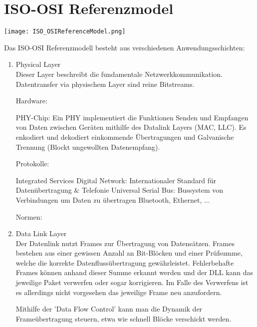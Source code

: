 \documentclass[11pt]{article}
\begin{document}
\section{ISO-OSI Referenzmodel}
    \texttt{[image: ISO\_OSIReferenceModel.png]}

    Das ISO-OSI Referenzmodell besteht aus verschiedenen Anwendungsschichten:
    \begin{enumerate}
        \item Physical Layer\\
        Dieser Layer beschreibt die fundamentale Netzwerkkommunikation. Datentransfer via
        physischem Layer sind reine Bitstreams.

        Hardware:
        \begin{addmargin}[1em]{1em}
            PHY-Chip: Ein PHY implementiert die Funktionen Senden und Empfangen von Daten zwischen
            Geräten mithilfe des Datalink Layers (MAC, LLC). Es enkodiert und dekodiert einkommende
            Übertragungen und Galvanische Trennung (Blockt ungewollten Datenempfang).
        \end{addmargin}

        Protokolle:
        \begin{addmargin}[1em]{1em}
            Integrated Services Digital Network: Internationaler Standard für Datenübertragung \& Telefonie
            Universal Serial Bus: Bussystem von Verbindungen um Daten zu übertragen
            Bluetooth, Ethernet, ...
        \end{addmargin}

        Normen: %

        \item Data Link Layer\\
        Der Datenlink nutzt Frames zur Übertragung von Datensätzen. Frames bestehen aus einer gewissen Anzahl
        an Bit-Blöcken und einer Prüfsumme, welche die korrekte Datenflussübertragung gewährleistet.
        Fehlerbehafte Frames können anhand dieser Summe erkannt werden und der DLL kann das jeweilige Paket verwerfen
        oder sogar korrigieren.
        Im Falle des Verwerfens ist es allerdings nicht vorgesehen das jeweilige Frame neu anzufordern.

        Mithilfe der 'Data Flow Control' kann man die Dynamik der Frameübertragung steuern, etwa wie schnell
        Blöcke verschickt werden.


\end{enumerate}
\end{document}
